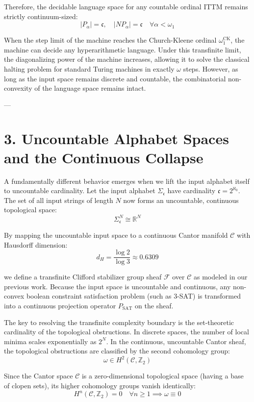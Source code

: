 \documentclass[11pt,twocolumn]{article}
\begin{document}
Therefore, the decidable language space for any countable ordinal ITTM remains strictly continuum-sized:
$$|P_{\alpha}| = \mathfrak{c}, \quad |NP_{\alpha}| = \mathfrak{c} \quad \forall \alpha < \omega_1$$

When the step limit of the machine reaches the Church-Kleene ordinal $\omega_1^{\text{CK}}$, the machine can decide any hyperarithmetic language. Under this transfinite limit, the diagonalizing power of the machine increases, allowing it to solve the classical halting problem for standard Turing machines in exactly $\omega$ steps. However, as long as the input space remains discrete and countable, the combinatorial non-convexity of the language space remains intact.

---

\section{3. Uncountable Alphabet Spaces and the Continuous Collapse}
A fundamentally different behavior emerges when we lift the input alphabet itself to uncountable cardinality. Let the input alphabet $\Sigma_{\mathfrak{c}}$ have cardinality $\mathfrak{c} = 2^{\aleph_0}$. The set of all input strings of length $N$ now forms an uncountable, continuous topological space:
$$\Sigma_{\mathfrak{c}}^N \cong \mathbb{R}^N$$

By mapping the uncountable input space to a continuous Cantor manifold $\mathcal{C}$ with Hausdorff dimension:
$$d_H = \frac{\log 2}{\log 3} \approx 0.6309$$

we define a transfinite Clifford stabilizer group sheaf $\mathcal{F}$ over $\mathcal{C}$ as modeled in our previous work. Because the input space is uncountable and continuous, any non-convex boolean constraint satisfaction problem (such as 3-SAT) is transformed into a continuous projection operator $P_{\text{SAT}}$ on the sheaf.

The key to resolving the transfinite complexity boundary is the set-theoretic cardinality of the topological obstructions. In discrete spaces, the number of local minima scales exponentially as $2^N$. In the continuous, uncountable Cantor sheaf, the topological obstructions are classified by the second cohomology group:
$$\omega \in H^2(\mathcal{C}, \mathbb{Z}_2)$$

Since the Cantor space $\mathcal{C}$ is a zero-dimensional topological space (having a base of clopen sets), its higher cohomology groups vanish identically:
$$H^n(\mathcal{C}, \mathbb{Z}_2) = 0 \quad \forall n \geq 1 \implies \omega \equiv 0$$
\end{document}
